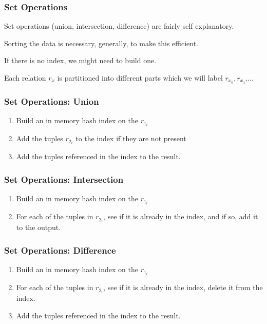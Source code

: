 \begin{frame}
\frametitle{Set Operations}

Set operations (union, intersection, difference) are fairly self explanatory. 

Sorting the data is necessary, generally, to make this efficient. 

If there is no index, we might need to build one. 

Each relation $r_{x}$ is partitioned into different parts which we will label $r_{x_{0}}, r_{x_{1}}...$. 

\end{frame}

\begin{frame}
\frametitle{Set Operations: Union}

\begin{enumerate}
		\item Build an in memory hash index on the $r_{1_{i}}$
		\item Add the tuples $r_{2_{i}}$ to the index if they are not present
		\item Add the tuples referenced in the index to the result.
	\end{enumerate}

\end{frame}

\begin{frame}
\frametitle{Set Operations: Intersection}
\begin{enumerate}
		\item Build an in memory hash index on the $r_{1_{i}}$
		\item For each of the tuples in $r_{2_{i}}$, see if it is already in the index, and if so, add it to the output.
	\end{enumerate}

\end{frame}

\begin{frame}
\frametitle{Set Operations: Difference}
\begin{enumerate}
		\item Build an in memory hash index on the $r_{1_{i}}$
		\item For each of the tuples in $r_{2_{i}}$, see if it is already in the index, delete it from the index.
		\item Add the tuples referenced in the index to the result.
	\end{enumerate}

\end{frame}

